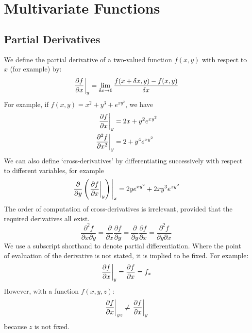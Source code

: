 \documentclass{article}
\begin{document}
\section{Multivariate Functions}
\subsection{Partial Derivatives}
We define the partial derivative of a two-valued function $f(x, y)$ with respect to $x$ (for example) by:
\begin{equation}
    \eval{\frac{\partial f}{\partial x}}_{y} = \lim_{\delta x\to 0} \frac{f(x + \delta x, y) - f(x, y)}{\delta x}
\end{equation}
For example, if $f(x,y) = x^2 + y^3 + e^{xy^2}$, we have
\begin{align*}
    \eval{\frac{\partial f}{\partial x}}_{y}     & = 2x + y^2 e^{xy^2} \\
    \eval{\frac{\partial^2 f}{\partial x^2}}_{y} & = 2 + y^4 e^{xy^2}
\end{align*}
We can also define `cross-derivatives' by differentiating successively with respect to different variables, for example
\[ \eval{\frac{\partial}{\partial y} \left( \eval{\frac{\partial f}{\partial x}}_{y} \right)}_{x} = 2ye^{xy^2} + 2xy^3e^{xy^2} \]
The order of computation of cross-derivatives is irrelevant, provided that the required derivatives all exist.
\begin{equation}
    \frac{\partial^2 f}{\partial x \partial y} = \frac{\partial}{\partial x}\frac{\partial f}{\partial y} = \frac{\partial}{\partial y}\frac{\partial f}{\partial x} = \frac{\partial^2 f}{\partial y \partial x}
\end{equation}
We use a subscript shorthand to denote partial differentiation. Where the point of evaluation of the derivative is not stated, it is implied to be fixed. For example:
\[ \eval{\frac{\partial f}{\partial x}}_{y} = \frac{\partial f}{\partial x} = f_x \]
However, with a function $f(x, y, z)$:
\[ \eval{\frac{\partial f}{\partial x}}_{yz} \neq \eval{\frac{\partial f}{\partial x}}_{y} \]
because $z$ is not fixed.
\end{document}
